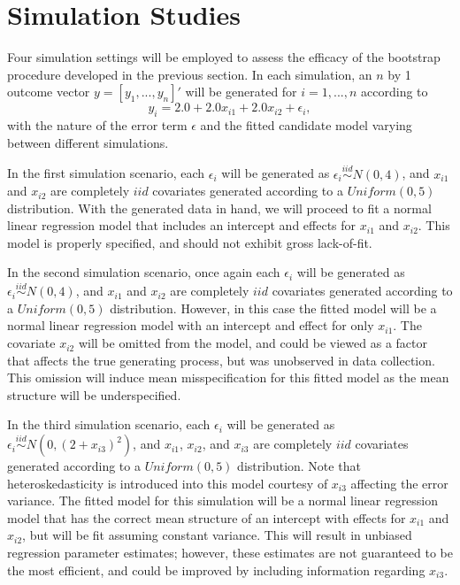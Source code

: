 \documentclass[12pt]{article} %
\theoremstyle{definition}
\begin{document}
\section{Simulation Studies}

Four simulation settings will be employed to assess the efficacy of the bootstrap procedure developed in the previous section. In each simulation, an $n$ by 1 outcome vector $y = [y_1,...,y_n]'$ will
be generated for $i = 1,...,n$ according to
\begin{equation*}
	y_i = 2.0 + 2.0 x_{i1} + 2.0 x_{i2} + \epsilon_i , 
\end{equation*}
with the nature of the error term $\epsilon$ and the fitted candidate model varying between different simulations.

In the first simulation scenario, each $\epsilon_i$ will be generated as $\epsilon_i \stackrel{iid}{\sim} N(0,4)$, and $x_{i1}$ and $x_{i2}$ are completely $iid$ covariates generated according to
a $Uniform(0,5)$ distribution. With the generated data in hand, we will proceed to fit a normal linear regression model that includes an intercept and effects for $x_{i1}$ and $x_{i2}$. This model
is properly specified, and should not exhibit gross lack-of-fit.

In the second simulation scenario, once again each $\epsilon_i$ will be generated as $\epsilon_i \stackrel{iid}{\sim} N(0,4)$, and $x_{i1}$ and $x_{i2}$ are completely $iid$ covariates generated according to
a $Uniform(0,5)$ distribution. However, in this case the fitted model will be a normal linear regression model with an intercept and effect for only
$x_{i1}$. The covariate $x_{i2}$ will be omitted from the model, and could be viewed as a factor that affects the true generating process, but
was unobserved in data collection. This omission will induce mean misspecification for this fitted model as the mean structure will be underspecified.

In the third simulation scenario, each $\epsilon_i$ will be generated as $\epsilon_i \stackrel{iid}{\sim} N \left( 0,(2 + x_{i3})^2 \right)$, and $x_{i1}$, $x_{i2}$, and $x_{i3}$ are completely $iid$ covariates
generated according to a $Uniform(0,5)$ distribution. Note that heteroskedasticity is introduced into this model courtesy of $x_{i3}$ affecting the error variance. The fitted model for
this simulation will be a normal linear regression model that has the correct mean structure of an intercept with effects for $x_{i1}$ and $x_{i2}$, but will be fit assuming constant variance.
This will result in unbiased regression parameter estimates; however, these estimates are not guaranteed to be the most efficient, and could be improved by including information regarding $x_{i3}$.
\end{document}
